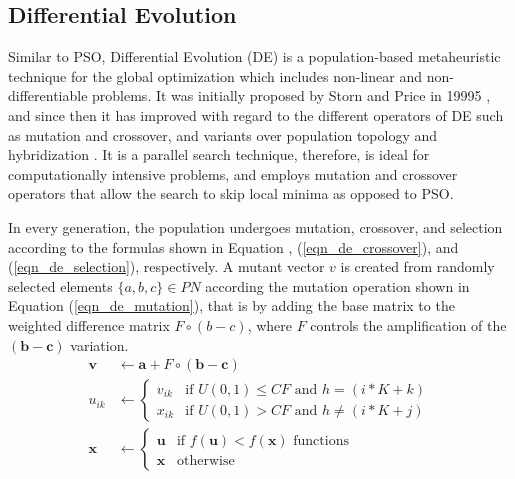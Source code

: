 \subsection{Differential Evolution}
Similar to PSO, Differential Evolution (DE) is a population-based metaheuristic technique for the global optimization which includes non-linear and non-differentiable problems. It was initially proposed by Storn and Price in 19995 \cite{Storn1997DifferentialSpaces}, and since then it has improved with regard to the different operators of DE such as mutation and crossover, and variants over population topology and hybridization \cite{Das2016RecentSurvey}. It is a parallel search technique, therefore, is ideal for computationally intensive problems, and employs mutation and crossover operators that allow the search to skip local minima as opposed to PSO.

In every generation, the population undergoes mutation, crossover, and selection according to the formulas shown in Equation , (\ref{eqn_de_crossover}), and (\ref{eqn_de_selection}), respectively. A mutant vector $v$ is created from randomly selected elements $\{a,b,c\}\in PN$ according the mutation operation shown in Equation (\ref{eqn_de_mutation}), that is by adding the base matrix to the weighted difference matrix $F\circ(b-c)$, where $F$ controls the amplification of the $(\textbf{b}-\textbf{c})$ variation.
\begin{align}
    \label{eqn_de_mutation}
    \textbf{v} & \leftarrow   \textbf{a} + F\circ(\textbf{b}-\textbf{c})\\
    \label{eqn_de_crossover}
    u_{ik} & \leftarrow 
    \begin{cases}
    v_{ik} & \mbox{if } U(0,1) \leq CF \mbox{ and } h = (i*K+k)\\
    x_{ik} & \mbox{if } U(0,1) > CF \mbox{ and } h \neq (i*K+j)
    \end{cases}\\
    \label{eqn_de_selection}
    \textbf{x} &\leftarrow 
    \begin{cases}
    \textbf{u} & \mbox{if } f(\textbf{u}) < f(\textbf{x})\mbox{ functions}\\
    \textbf{x} & \mbox{otherwise }
    \end{cases}
\end{align}

